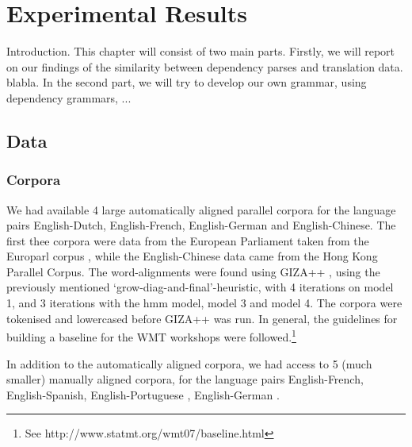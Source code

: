 \documentclass{report}
\begin{document}
\chapter{Experimental Results}

Introduction.
This chapter will consist of two main parts. Firstly, we will report on our findings of the similarity between dependency parses and translation data. blabla. In the second part, we will try to develop our own grammar, using dependency grammars, ...



\section{Data}

\subsection{Corpora}

We had available 4 large automatically aligned parallel corpora for the language pairs English-Dutch, English-French, English-German and English-Chinese. The first thee corpora were data from the European Parliament taken from the Europarl corpus \citep{koehn2005europarl}, while the English-Chinese data came from the Hong Kong Parallel Corpus. The word-alignments were found using GIZA++ \citep{och03:asc}, using the previously mentioned `grow-diag-and-final'-heuristic, with 4 iterations on model 1, and 3 iterations with the hmm model, model 3 and model 4. The corpora were tokenised and lowercased before GIZA++ was run. In general, the guidelines for building a baseline for the WMT workshops were followed.\footnote{See http://www.statmt.org/wmt07/baseline.html}

In addition to the automatically aligned corpora, we had access to 5 (much smaller) manually aligned corpora, for the language pairs English-French, \citep{graca2008building,och2000improved} English-Spanish, English-Portuguese \citep{graca2008building}, English-German \citep{pado2006optimal}.
\end{document}
